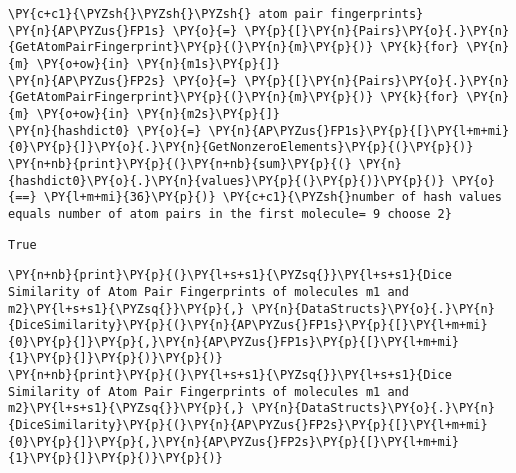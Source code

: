     \begin{tcolorbox}[breakable, size=fbox, boxrule=1pt, pad at break*=1mm,colback=cellbackground, colframe=cellborder]
\begin{Verbatim}[commandchars=\\\{\}]
\PY{c+c1}{\PYZsh{}\PYZsh{}\PYZsh{} atom pair fingerprints}
\PY{n}{AP\PYZus{}FP1s} \PY{o}{=} \PY{p}{[}\PY{n}{Pairs}\PY{o}{.}\PY{n}{GetAtomPairFingerprint}\PY{p}{(}\PY{n}{m}\PY{p}{)} \PY{k}{for} \PY{n}{m} \PY{o+ow}{in} \PY{n}{m1s}\PY{p}{]}
\PY{n}{AP\PYZus{}FP2s} \PY{o}{=} \PY{p}{[}\PY{n}{Pairs}\PY{o}{.}\PY{n}{GetAtomPairFingerprint}\PY{p}{(}\PY{n}{m}\PY{p}{)} \PY{k}{for} \PY{n}{m} \PY{o+ow}{in} \PY{n}{m2s}\PY{p}{]}
\PY{n}{hashdict0} \PY{o}{=} \PY{n}{AP\PYZus{}FP1s}\PY{p}{[}\PY{l+m+mi}{0}\PY{p}{]}\PY{o}{.}\PY{n}{GetNonzeroElements}\PY{p}{(}\PY{p}{)}
\PY{n+nb}{print}\PY{p}{(}\PY{n+nb}{sum}\PY{p}{(} \PY{n}{hashdict0}\PY{o}{.}\PY{n}{values}\PY{p}{(}\PY{p}{)}\PY{p}{)} \PY{o}{==} \PY{l+m+mi}{36}\PY{p}{)} \PY{c+c1}{\PYZsh{}number of hash values equals number of atom pairs in the first molecule= 9 choose 2}
\end{Verbatim}
\end{tcolorbox}

    \begin{Verbatim}[commandchars=\\\{\}]
True
    \end{Verbatim}

    \begin{tcolorbox}[breakable, size=fbox, boxrule=1pt, pad at break*=1mm,colback=cellbackground, colframe=cellborder]
\begin{Verbatim}[commandchars=\\\{\}]
\PY{n+nb}{print}\PY{p}{(}\PY{l+s+s1}{\PYZsq{}}\PY{l+s+s1}{Dice Similarity of Atom Pair Fingerprints of molecules m1 and m2}\PY{l+s+s1}{\PYZsq{}}\PY{p}{,} \PY{n}{DataStructs}\PY{o}{.}\PY{n}{DiceSimilarity}\PY{p}{(}\PY{n}{AP\PYZus{}FP1s}\PY{p}{[}\PY{l+m+mi}{0}\PY{p}{]}\PY{p}{,}\PY{n}{AP\PYZus{}FP1s}\PY{p}{[}\PY{l+m+mi}{1}\PY{p}{]}\PY{p}{)}\PY{p}{)}
\PY{n+nb}{print}\PY{p}{(}\PY{l+s+s1}{\PYZsq{}}\PY{l+s+s1}{Dice Similarity of Atom Pair Fingerprints of molecules m1 and m2}\PY{l+s+s1}{\PYZsq{}}\PY{p}{,} \PY{n}{DataStructs}\PY{o}{.}\PY{n}{DiceSimilarity}\PY{p}{(}\PY{n}{AP\PYZus{}FP2s}\PY{p}{[}\PY{l+m+mi}{0}\PY{p}{]}\PY{p}{,}\PY{n}{AP\PYZus{}FP2s}\PY{p}{[}\PY{l+m+mi}{1}\PY{p}{]}\PY{p}{)}\PY{p}{)}
\end{Verbatim}
\end{tcolorbox}

